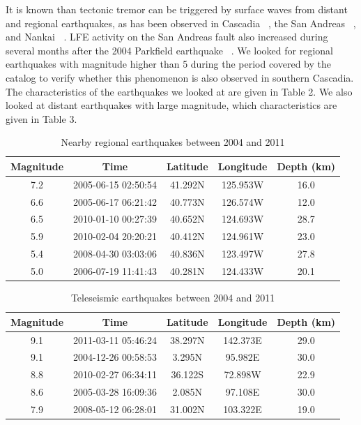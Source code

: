 \documentclass[draft]{agujournal2019}
\begin{document}
It is known than tectonic tremor can be triggered by surface waves from distant and regional earthquakes, as has been observed in Cascadia ~\cite{RUB_2009}, the San Andreas ~\cite{PEN_2009, GUI_2010}, and Nankai \textbf{~\cite{MIY_2008,HAN_2014}}. LFE activity on the San Andreas fault also increased during several months after the 2004 Parkfield earthquake ~\cite{SHE_2017}. We looked for regional earthquakes with magnitude higher than 5 during the period covered by the catalog to verify whether this phenomenon is also observed in southern Cascadia. The characteristics of the earthquakes we looked at are given in Table 2. We also looked at distant earthquakes with large magnitude, which  characteristics are given in Table 3. \\

\begin{table}
\caption{Nearby regional earthquakes between 2004 and 2011}
\centering
\begin{tabular}{c c c c c}
\hline
Magnitude & Time & Latitude & Longitude & Depth (km) \\
\hline
7.2 & 2005-06-15 02:50:54 & 41.292N & 125.953W & 16.0 \\
6.6 & 2005-06-17 06:21:42 & 40.773N & 126.574W & 12.0 \\
6.5 & 2010-01-10 00:27:39 & 40.652N & 124.693W & 28.7 \\
5.9 & 2010-02-04 20:20:21 & 40.412N & 124.961W & 23.0 \\
5.4 & 2008-04-30 03:03:06 & 40.836N & 123.497W & 27.8 \\
5.0 & 2006-07-19 11:41:43 & 40.281N & 124.433W & 20.1 \\
\hline
\end{tabular}
\end{table}

\begin{table}
\caption{Teleseismic earthquakes between 2004 and 2011}
\centering
\begin{tabular}{c c c c c}
\hline
Magnitude & Time & Latitude & Longitude & Depth (km) \\
\hline
9.1 & 2011-03-11 05:46:24 & 38.297N & 142.373E & 29.0 \\
9.1 & 2004-12-26 00:58:53 & 3.295N & 95.982E & 30.0 \\
8.8 & 2010-02-27 06:34:11 & 36.122S & 72.898W & 22.9 \\ 
8.6 & 2005-03-28 16:09:36 & 2.085N & 97.108E & 30.0 \\ 
7.9 & 2008-05-12 06:28:01 & 31.002N & 103.322E & 19.0 \\ 
\hline
\end{tabular}
\end{table}
\end{document}
